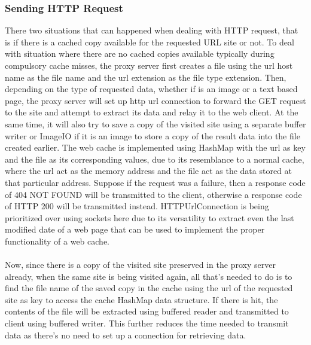 \documentclass[12pt]{article}%
\begin{document}
\subsubsection*{Sending HTTP Request}
There two situations that can happened when dealing with HTTP request, that is if there is a cached copy available for the requested URL site or not. To deal with situation where there are no cached copies available typically during compulsory cache misses, the proxy server first creates a file using the url host name as the file name and the url extension as the file type extension. Then, depending on the type of requested data, whether if is an image or a text based page, the proxy server will set up http url connection to forward the GET request to the site and attempt to extract its data and relay it to the web client. At the same time, it will also try to save a copy of the visited site using a separate buffer writer or ImageIO if it is an image to store a copy of the result data into the file created earlier. The web cache is implemented using HashMap with the url as key and the file as its corresponding values, due to its resemblance to a normal cache, where the url act as the memory address and the file act as the data stored at that particular address. Suppose if the request was a failure, then a response code of 404 NOT FOUND will be transmitted to the client, otherwise a response code of HTTP 200 will be transmitted instead. HTTPUrlConnection is being prioritized over using sockets here due to its versatility to extract even the last modified date of a web page that can be used to implement the proper functionality of a web cache.\\ \\
Now, since there is a copy of the visited site preserved in the proxy server already, when the same site is being visited again, all that's needed to do is to find the file name of the saved copy in the cache using the url of the requested site as key to access the cache HashMap data structure. If there is hit, the contents of the file will be extracted using buffered reader and transmitted to client using buffered writer. This further reduces the time needed to transmit data as there's no need to set up a connection for retrieving data. \\
\end{document}
